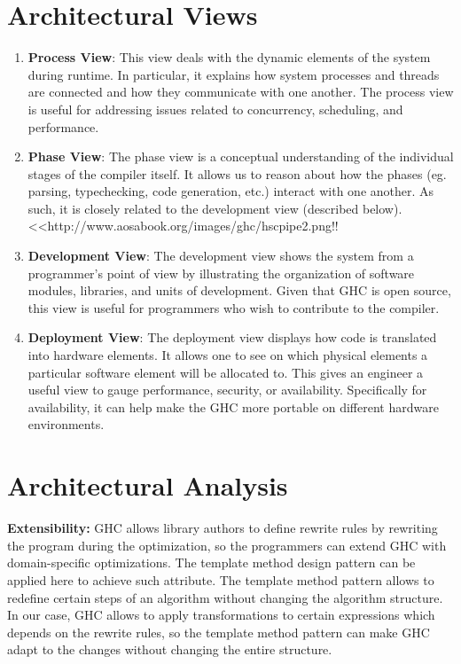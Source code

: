 \documentclass[a4paper]{article}
\begin{document}
\section{Architectural Views}


\begin{enumerate}
\item \textbf{Process View}: This view deals with the dynamic elements of the system during runtime.  In particular, it explains how system processes and threads are connected and how they communicate with one another.  The process view is useful for addressing issues related to concurrency, scheduling, and performance.

\item \textbf{Phase View}: The phase view is a conceptual understanding of the individual stages of the compiler itself. It allows us to reason about how the phases (eg. parsing, typechecking, code generation, etc.) interact with one another. As such, it is closely related to the development view (described below). \\
<<http://www.aosabook.org/images/ghc/hscpipe2.png!!

\item \textbf{Development View}: The development view shows the system from a programmer's point of view by illustrating the organization of software modules, libraries, and units of development.  Given that GHC is open source, this view is useful for programmers who wish to contribute to the compiler.

\item \textbf{Deployment View}: The deployment view displays how code is translated into hardware elements.  It allows one to see on which physical elements a particular software element will be allocated to.  This gives an engineer a useful view to gauge performance, security, or availability.  Specifically for availability, it can help make the GHC more portable on different hardware environments.

\end{enumerate}

\section{Architectural Analysis}

\textbf{Extensibility:} GHC allows library authors to define rewrite rules by rewriting the program during the optimization, so the programmers can extend GHC with domain-specific optimizations. The template method design pattern can be applied here to achieve such attribute. The template method pattern allows to redefine certain steps of an algorithm without changing the algorithm structure. In our case, GHC allows to apply transformations to certain expressions which depends on the rewrite rules, so the template method pattern can make GHC adapt to the changes without changing the entire structure. 
\end{document}
